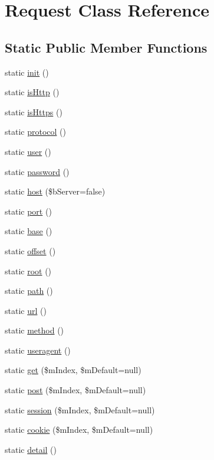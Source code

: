 \hypertarget{class_request}{\section{Request Class Reference}
\label{class_request}
}
\subsection*{Static Public Member Functions}
\begin{DoxyCompactItemize}
\item 
static \hyperlink{class_request_a0552dcea819c77f239bb6db060e17b47}{init} ()
\item 
static \hyperlink{class_request_a8d58147bb9572424021c44b0ebb3f85a}{is\-Http} ()
\item 
static \hyperlink{class_request_afab6f7cb93efa72b28f3e8b2eba901dd}{is\-Https} ()
\item 
static \hyperlink{class_request_a806349a06939db0150ce9d7d3e6f54f5}{protocol} ()
\item 
static \hyperlink{class_request_a512dd9b95abef2346ad3af2e593d10c1}{user} ()
\item 
static \hyperlink{class_request_a1ad0dec68fffe32c3b59e5130b63c1ba}{password} ()
\item 
static \hyperlink{class_request_a291eeae48e2675a5301279b0e1b8d8e2}{host} (\$b\-Server=false)
\item 
static \hyperlink{class_request_a495e06b9d24638c678259b6f3aefbcd6}{port} ()
\item 
static \hyperlink{class_request_aca04f9b433bb568c10d32ee114a0d02c}{base} ()
\item 
static \hyperlink{class_request_a64f9327ac4a815b3f114d50fd6ba521b}{offset} ()
\item 
static \hyperlink{class_request_a6b69986e47c94186cce2336f11ad1f6e}{root} ()
\item 
static \hyperlink{class_request_ae1725b521b1833602f3f554566142c51}{path} ()
\item 
static \hyperlink{class_request_abf1e0caab3f4027d508eec81489b260b}{url} ()
\item 
static \hyperlink{class_request_a4d6813e2943a1ced4ae7159e3a382695}{method} ()
\item 
static \hyperlink{class_request_a12099938e1500f4559b32b833de2088e}{useragent} ()
\item 
static \hyperlink{class_request_af0cfa5de39cd1b78dd183f8755c5881a}{get} (\$m\-Index, \$m\-Default=null)
\item 
static \hyperlink{class_request_ab2b509ddd1e625547bd79a8f207670e3}{post} (\$m\-Index, \$m\-Default=null)
\item 
static \hyperlink{class_request_af0d98675f85be7ee4fca80e18942693b}{session} (\$m\-Index, \$m\-Default=null)
\item 
static \hyperlink{class_request_ad6b7fe8e73dd7eed912086488002ddd0}{cookie} (\$m\-Index, \$m\-Default=null)
\item 
static \hyperlink{class_request_a2817486e88b192ef552ebca4c62d70af}{detail} ()
\end{DoxyCompactItemize}


